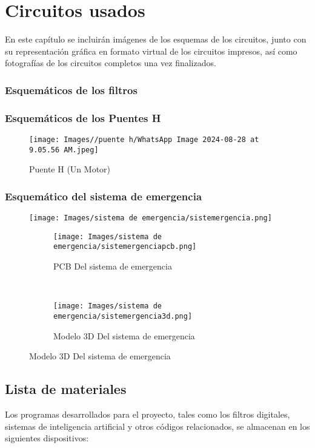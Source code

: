 \documentclass{article}
\begin{document}
\section{Circuitos usados}
En este capítulo se incluirán imágenes de los esquemas de los circuitos, junto con su representación gráfica en formato virtual de los circuitos impresos, así como fotografías de los circuitos completos una vez finalizados.


\subsubsection{Esquemáticos de los filtros}


\subsubsection{Esquemáticos de los Puentes H}

\begin{figure}[H]
    \centering
     \texttt{[image: Images//puente h/WhatsApp Image 2024-08-28 at 9.05.56 AM.jpeg]}
    \caption{Puente H (Un Motor)}
\end{figure}

\subsubsection{Esquemático del sistema de emergencia}

\begin{figure}[H]
    \centering
    \texttt{[image: Images/sistema de emergencia/sistemergencia.png]}
    \caption{Esquemático del sistema de emegencia}


    \begin{subfigure}[t]{0.5\textwidth}
        \centering
        \texttt{[image: Images/sistema de emergencia/sistemergenciapcb.png]}
        \caption{PCB Del sistema de emergencia}
    \end{subfigure}%
    ~ 
    \begin{subfigure}[t]{0.5\textwidth}
        \centering
        \texttt{[image: Images/sistema de emergencia/sistemergencia3d.png]}
        \caption{Modelo 3D Del sistema de emergencia}
    \end{subfigure}

\end{figure}

\subsection{Lista de materiales}
Los programas desarrollados para el proyecto, tales como los filtros digitales, sistemas de inteligencia artificial y otros códigos relacionados, se almacenan en los siguientes dispositivos:
\end{document}
